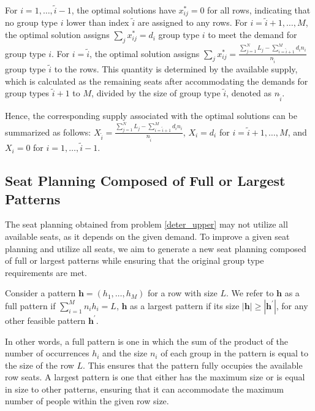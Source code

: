 For $i = 1,\ldots, \tilde{i}-1$, the optimal solutions have $x_{ij}^{*} = 0$ for all rows, indicating that no group type $i$ lower than index $\tilde{i}$ are assigned to any rows. For $i = \tilde{i}+1,\ldots, M$, the optimal solution assigns $\sum_{j} x_{ij}^{*} = d_{i}$ group type $i$ to meet the demand for group type $i$. For $i = \tilde{i}$, the optimal solution assigns $\sum_{j} x_{ij}^{*} = \frac{\sum_{j=1}^{N}L_{j} - \sum_{i = \tilde{i}+1}^{M} {d_i n_i}}{n_{\tilde{i}}}$ group type $\tilde{i}$ to the rows. This quantity is determined by the available supply, which is calculated as the remaining seats after accommodating the demands for group types $\tilde{i}+1$ to $M$, divided by the size of group type $\tilde{i}$, denoted as $n_{\tilde{i}}$.

Hence, the corresponding supply associated with the optimal solutions can be summarized as follows: $X_{\tilde{i}} = \frac{\sum_{j=1}^{N}L_{j} - \sum_{i = \tilde{i}+1}^{M} {d_i n_i}}{n_{\tilde{i}}}$, $X_{i} = d_{i}$ for $i = \tilde{i} +1,\ldots, M$, and $X_{i} = 0$ for $i = 1, \ldots, \tilde{i}-1$.

\subsection{Seat Planning Composed of Full or Largest Patterns}
The seat planning obtained from problem \eqref{deter_upper} may not utilize all available seats, as it depends on the given demand. To improve a given seat planning and utilize all seats, we aim to generate a new seat planning composed of full or largest patterns while ensuring that the original group type requirements are met.

\begin{definition}
Consider a pattern $\bm{h} = (h_1, \ldots, h_M)$ for a row with size $L$. We refer to $\bm{h}$ as a full pattern if $\sum_{i=1}^{M} n_i h_i = L$, $\bm{h}$ as a largest pattern if its size $|\bm{h}| \geq |\bm{h}^{\prime}|$, for any other feasible pattern $\bm{h}^{\prime}$.
\end{definition}

In other words, a full pattern is one in which the sum of the product of the number of occurrences $h_i$ and the size $n_i$ of each group in the pattern is equal to the size of the row $L$. This ensures that the pattern fully occupies the available row seats. A largest pattern is one that either has the maximum size or is equal in size to other patterns, ensuring that it can accommodate the maximum number of people within the given row size.


